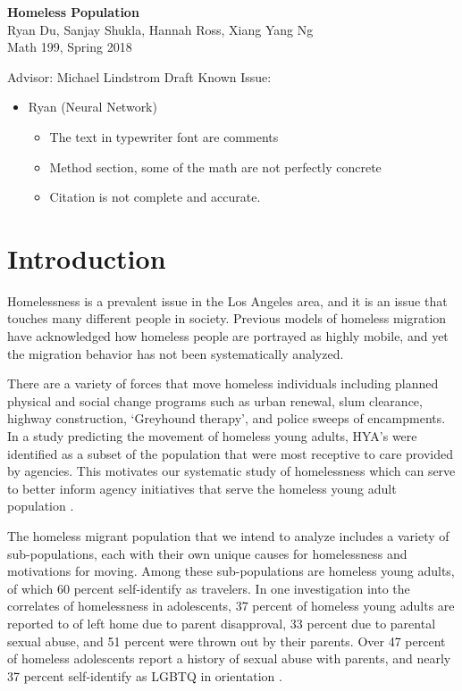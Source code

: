 \documentclass[11pt,letterpaper]{article}
\begin{document}
\begin{titlepage}
\begin{center}
\vspace*{6cm}

\huge\textbf{Homeless Population}\\[3mm]
\Large Ryan Du, Sanjay Shukla, Hannah Ross, Xiang Yang Ng\\[1mm]

Math 199, Spring 2018

Advisor: Michael Lindstrom
\vfill
Draft Known Issue:
\begin{itemize}
\item Ryan (Neural Network)
\begin{itemize}
    \item The text in typewriter font are comments
    \item Method section, some of the math are not perfectly concrete
    \item Citation is not complete and accurate.
\end{itemize}
\end{itemize}
\end{center}
\end{titlepage}

\tableofcontents 

\newpage

\section{Introduction}

Homelessness is a prevalent issue in the Los Angeles area, and it is an issue that touches many different people in society. Previous models of homeless migration have acknowledged how homeless people are portrayed as highly mobile, and yet the migration behavior has not been systematically analyzed. 

There are a variety of forces that move homeless individuals including planned physical and social change programs such as urban renewal, slum clearance, highway construction, ‘Greyhound therapy’, and police sweeps of encampments. In a study predicting the movement of homeless young adults, HYA’s were identified as a subset of the population that were most receptive to care provided by agencies. This motivates our systematic study of homelessness which can serve to better inform agency initiatives that serve the homeless young adult population \cite{doi:10.1086/696129}.


The homeless migrant population that we intend to analyze includes a variety of sub-populations, each with their own unique causes for homelessness and motivations for moving. Among these sub-populations are homeless young adults, of which 60 percent self-identify as travelers. In one investigation into the correlates of homelessness in adolescents, 37 percent of homeless young adults are reported to of left home due to parent disapproval, 33 percent due to parental sexual abuse, and 51 percent were thrown out by their parents. Over 47 percent of homeless adolescents report a history of sexual abuse with parents, and nearly 37 percent self-identify as LGBTQ in orientation \cite{litreview}.
\end{document}
